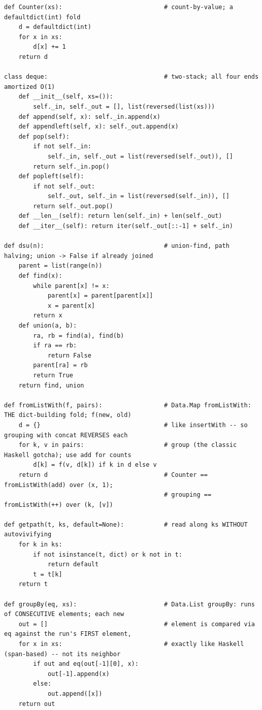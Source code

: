 \documentclass[10pt,letterpaper]{book}
\begin{document}
\begin{lstlisting}[style=file]
def Counter(xs):                            # count-by-value; a defaultdict(int) fold
    d = defaultdict(int)
    for x in xs:
        d[x] += 1
    return d

class deque:                                # two-stack; all four ends amortized O(1)
    def __init__(self, xs=()):
        self._in, self._out = [], list(reversed(list(xs)))
    def append(self, x): self._in.append(x)
    def appendleft(self, x): self._out.append(x)
    def pop(self):
        if not self._in:
            self._in, self._out = list(reversed(self._out)), []
        return self._in.pop()
    def popleft(self):
        if not self._out:
            self._out, self._in = list(reversed(self._in)), []
        return self._out.pop()
    def __len__(self): return len(self._in) + len(self._out)
    def __iter__(self): return iter(self._out[::-1] + self._in)

def dsu(n):                                 # union-find, path halving; union -> False if already joined
    parent = list(range(n))
    def find(x):
        while parent[x] != x:
            parent[x] = parent[parent[x]]
            x = parent[x]
        return x
    def union(a, b):
        ra, rb = find(a), find(b)
        if ra == rb:
            return False
        parent[ra] = rb
        return True
    return find, union

def fromListWith(f, pairs):                 # Data.Map fromListWith: THE dict-building fold; f(new, old)
    d = {}                                  # like insertWith -- so grouping with concat REVERSES each
    for k, v in pairs:                      # group (the classic Haskell gotcha); use add for counts
        d[k] = f(v, d[k]) if k in d else v
    return d                                # Counter == fromListWith(add) over (x, 1);
                                            # grouping == fromListWith(++) over (k, [v])

def getpath(t, ks, default=None):           # read along ks WITHOUT autovivifying
    for k in ks:
        if not isinstance(t, dict) or k not in t:
            return default
        t = t[k]
    return t

def groupBy(eq, xs):                        # Data.List groupBy: runs of CONSECUTIVE elements; each new
    out = []                                # element is compared via eq against the run's FIRST element,
    for x in xs:                            # exactly like Haskell (span-based) -- not its neighbor
        if out and eq(out[-1][0], x):
            out[-1].append(x)
        else:
            out.append([x])
    return out


\end{lstlisting}
\end{document}
